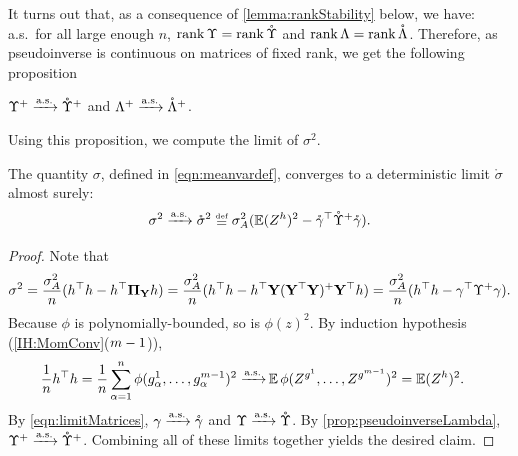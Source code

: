 \documentclass[main.tex]{subfiles}
\begin{document}
It turns out that, as a consequence of \cref{lemma:rankStability} below, we have: a.s.\ for all large enough $n$, $\operatorname{rank} \Upsilon  = \operatorname{rank} \mathring {\Upsilon }$ and $\operatorname{rank} \Lambda  = \operatorname{rank} \mathring{\Lambda }$.
Therefore, as pseudoinverse is continuous on matrices of fixed rank,
we get the following proposition
\begin{prop}\label{prop:pseudoinverseLambda}
$\Upsilon ^+ \xrightarrow{\mathrm{a.s.}} \mathring{\Upsilon }^+$ and $\Lambda ^+ \xrightarrow{\mathrm{a.s.}} \mathring{\Lambda }^+$.
\end{prop}

Using this proposition, we compute the limit of $\sigma^2$.
\begin{lemma}\label{lemma:sigmaConverges}
The quantity $\sigma$, defined in \cref{eqn:meanvardef}, converges to a deterministic limit $\mathring \sigma$ almost surely:
\begin{equation}\sigma^2 \asto \mathring \sigma^2 \defeq \sigma_A^2 (\EV (Z^h)^2 - \mathring \gammame^\trsp \mathring \Upsilonme^+ \mathring \gammame).
  \label{eqn:mathringsigma}
\end{equation}
\end{lemma}
\begin{proof}
Note that
\begin{align*}
    \sigma^2 = \frac{\sigma_A^2}{n} (h^\top h - h^\top \boldsymbol{\Pi}_{\mathbf{Y}} h)
        = \frac{\sigma_A^2}{n} (h^\top h - h^\top {\mathbf{Y}} (\mathbf{Y}^\top \mathbf{Y})^+ \mathbf{Y}^\top h)
        = \frac{\sigma_A^2}{n} (h^\top h - \gamma^\top \Upsilon ^+ \gamma).
\end{align*}
Because $\phi$ is polynomially-bounded, so is $\phi(z)^2$.
By induction hypothesis (\ref{IH:MomConv}($m-1$)),
\begin{align*}
    \frac{1}{n} h^\top h = \frac{1}{n} \sum_{\alpha = 1}^n \phi(g^1_\alpha, \ldots, g^{m - 1}_\alpha)^2
    \xrightarrow{\mathrm{a.s.}}
    &\operatorname*{\mathbb{E}}
      \phi(Z^{g^1}, \ldots, Z^{g^{m-1}})^2
    =
      \operatorname*{\mathbb{E}} (Z^h)^2
      .
\end{align*}
By \cref{eqn:limitMatrices}, $\gamma \xrightarrow{\mathrm{a.s.}} \mathring{\gamma}$ and $\Upsilon  \xrightarrow{\mathrm{a.s.}} \mathring{\Upsilon }$.
By \cref{prop:pseudoinverseLambda}, $\Upsilon ^+ \xrightarrow{\mathrm{a.s.}} \mathring{\Upsilon }^+$.
Combining all of these limits together yields the desired claim.
\end{proof}
\end{document}
